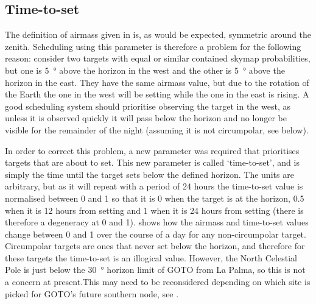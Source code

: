 \subsection{Time-to-set}
\label{sec:tts}
\begin{colsection}

The definition of airmass given in  is, as would be expected, symmetric around the zenith. Scheduling using this parameter is therefore a problem for the following reason: consider two targets with equal or similar contained skymap probabilities, but one is \SI{5}{\degree} above the horizon in the west and the other is \SI{5}{\degree} above the horizon in the east. They have the same airmass value, but due to the rotation of the Earth the one in the west will be setting while the one in the east is rising. A good scheduling system should prioritise observing the target in the west, as unless it is observed quickly it will pass below the horizon and no longer be visible for the remainder of the night (assuming it is not circumpolar, see below).

In order to correct this problem, a new parameter was required that prioritises targets that are about to set. This new parameter is called `time-to-set', and is simply the time until the target sets below the defined horizon. The units are arbitrary, but as it will repeat with a period of 24 hours the time-to-set value is normalised between 0 and 1 so that it is 0 when the target is at the horizon, 0.5 when it is 12 hours from setting and 1 when it is 24 hours from setting (there is therefore a degeneracy at 0 and 1).  shows how the airmass and time-to-set values change between 0 and 1 over the course of a day for any non-circumpolar target. Circumpolar targets are ones that never set below the horizon, and therefore for these targets the time-to-set is an illogical value. However, the North Celestial Pole is just below the \SI{30}{\degree} horizon limit of GOTO from La Palma, so this is not a concern at present.\@ This may need to be reconsidered depending on which site is picked for GOTO's future southern node, see .


\end{colsection}
